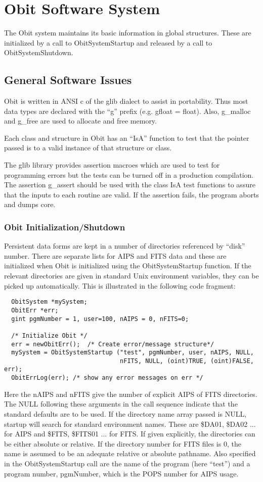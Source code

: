 \documentclass[11pt]{article}
\begin{document}
\section{Obit Software System}
The Obit system maintains its basic information in global structures.
These are initialized by a call to ObitSystemStartup and released by a
call to ObitSystemShutdown.

\subsection{General Software Issues}
Obit is written in ANSI c of the glib dialect to assist in
portability.  
Thus most data types are declared with the ``g'' prefix (e.g. gfloat =
float). 
Also, g\_malloc and g\_free are used to allocate and free memory.

Each class and structure in Obit has an ``IsA'' function to test that
the pointer passed is to a valid instance of that structure or class.

The glib library provides assertion macroes which are used to test for
programming errors but the tests can be turned off in a production
compilation.
The assertion  g\_assert should be used with the class IsA test
functions to assure that the inputs to each routine are valid.
If the assertion fails, the program aborts and dumps core.

\subsubsection{Obit Initialization/Shutdown}
Persistent data forms are kept in a number of directories referenced
by ``disk'' number.
There are separate lists for AIPS and FITS data and these are
initialized when Obit is initialized using the ObitSystemStartup
function.
If the relevant directories are given in standard Unix environment
variables, they can be picked up automatically.
This is illustrated in the following code fragment:
\begin{verbatim}
  ObitSystem *mySystem;
  ObitErr *err;
  gint pgmNumber = 1, user=100, nAIPS = 0, nFITS=0;

  /* Initialize Obit */
  err = newObitErr();  /* Create error/message structure*/
  mySystem = ObitSystemStartup ("test", pgmNumber, user, nAIPS, NULL,
                                nFITS, NULL, (oint)TRUE, (oint)FALSE, err);
  ObitErrLog(err); /* show any error messages on err */
\end{verbatim}
Here the nAIPS and nFITS give the number of explicit AIPS of FITS
directories. 
The NULL following these arguments in the call sequence indicate that
the standard defaults are to be used.
If the directory name array passed is NULL, startup will search for
standard environment names. 
These are \$DA01, \$DA02 ... for AIPS and \$FITS, \$FITS01 ... for
FITS.
If given explicitly, the directories can be either absolute or
relative.
If the directory number for FITS files is 0, the name is assumed to be
an adequate relative or absolute pathname.
Also specified in the ObitSystemStartup call are the name of the
program (here ``test'') and a program number, pgmNumber, which is the
POPS number for AIPS usage.
\end{document}
